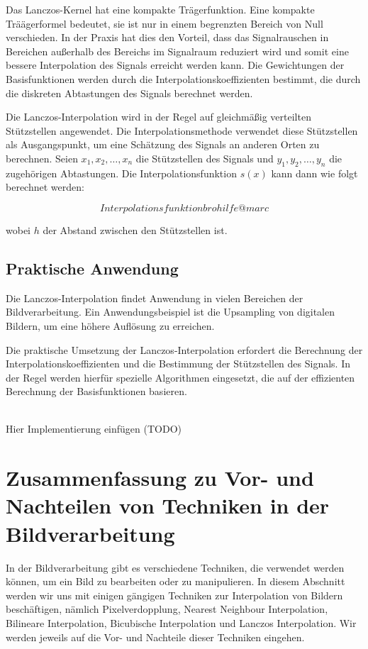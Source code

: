 Das Lanczos-Kernel hat eine kompakte Trägerfunktion.
Eine kompakte Träägerformel bedeutet, sie ist nur in einem begrenzten Bereich von Null verschieden. 
In der Praxis hat dies den Vorteil, dass das Signalrauschen in Bereichen außerhalb des Bereichs im Signalraum reduziert wird und somit eine bessere Interpolation des Signals erreicht werden kann.
Die Gewichtungen der Basisfunktionen werden durch die Interpolationskoeffizienten bestimmt, die durch die diskreten Abtastungen des Signals berechnet werden.

Die Lanczos-Interpolation wird in der Regel auf gleichmäßig verteilten Stützstellen angewendet. 
Die Interpolationsmethode verwendet diese Stützstellen als Ausgangspunkt, um eine Schätzung des Signals an anderen Orten zu berechnen. 
Seien $x_1, x_2, \ldots, x_n$ die Stützstellen des Signals und $y_1, y_2, \ldots, y_n$ die zugehörigen Abtastungen. Die Interpolationsfunktion $s(x)$ kann dann wie folgt berechnet werden:

\begin{equation}
Interpolationsfunktion bro hilfe @marc
\end{equation}

wobei $h$ der Abstand zwischen den Stützstellen ist.

\subsection{Praktische Anwendung}

Die Lanczos-Interpolation findet Anwendung in vielen Bereichen der Bildverarbeitung. 
Ein Anwendungsbeispiel ist die Upsampling von digitalen Bildern, um eine höhere Auflösung zu erreichen.

Die praktische Umsetzung der Lanczos-Interpolation erfordert die Berechnung der Interpolationskoeffizienten und die Bestimmung der Stützstellen des Signals. 
In der Regel werden hierfür spezielle Algorithmen eingesetzt, die auf der effizienten Berechnung der Basisfunktionen basieren.

\\Hier Implementierung einfügen (TODO) 

\section{Zusammenfassung zu Vor- und Nachteilen von Techniken in der Bildverarbeitung}

In der Bildverarbeitung gibt es verschiedene Techniken, die verwendet werden können, um ein Bild zu bearbeiten oder zu manipulieren. 
In diesem Abschnitt werden wir uns mit einigen gängigen Techniken zur Interpolation von Bildern beschäftigen, nämlich Pixelverdopplung, Nearest Neighbour Interpolation, Bilineare Interpolation, Bicubische Interpolation und Lanczos Interpolation. 
Wir werden jeweils auf die Vor- und Nachteile dieser Techniken eingehen.

